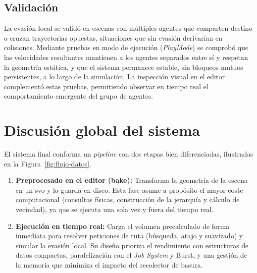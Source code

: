 \subsection{Validación}

La evasión local se validó en escenas con múltiples agentes que comparten destino o cruzan trayectorias opuestas, situaciones que sin evasión derivarían en colisiones.
Mediante pruebas en modo de ejecución (\textit{PlayMode}) se comprobó que las velocidades resultantes mantienen a los agentes separados entre sí y respetan la geometría estática, y que el sistema permanece estable, sin bloqueos mutuos persistentes, a lo largo de la simulación.
La inspección visual en el editor complementó estas pruebas, permitiendo observar en tiempo real el comportamiento emergente del grupo de agentes.

\section{Discusión global del sistema}
\label{sec:discusion-global}

El sistema final conforma un \textit{pipeline} con dos etapas bien diferenciadas, ilustradas en la Figura~\ref{fig:flujo-datos}.

\begin{enumerate}
  \item \textbf{Preprocesado en el editor (\gls{bake}):} Transforma la geometría de la escena en un \acrshort{svo} y lo guarda en disco.
  Esta fase asume a propósito el mayor coste computacional (consultas físicas, construcción de la jerarquía y cálculo de vecindad), ya que se ejecuta una sola vez y fuera del tiempo real.
  \item \textbf{Ejecución en tiempo real:} Carga el volumen precalculado de forma inmediata para resolver peticiones de ruta (búsqueda, atajo y suavizado) y simular la evasión local.
  Su diseño prioriza el rendimiento con estructuras de datos compactas, paralelización con el \textit{Job System} y Burst, y una gestión de la memoria que minimiza el impacto del recolector de basura.
\end{enumerate}

